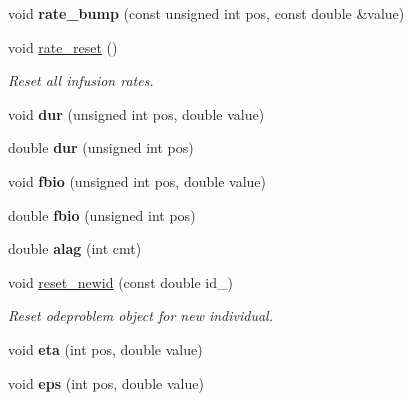 \begin{DoxyCompactItemize}
void {\bfseries rate\+\_\+bump} (const unsigned int pos, const double \&value)
\item 
\mbox{\label{classodeproblem_a89919c8495a969c85027b645cc611549}} 
void \hyperlink{classodeproblem_a89919c8495a969c85027b645cc611549}{rate\+\_\+reset} ()
\begin{DoxyCompactList}\small\item\em Reset all infusion rates. \end{DoxyCompactList}\item 
\mbox{\label{classodeproblem_a6b01a064fdeca43c8d70c9acaf4cd01a}} 
void {\bfseries dur} (unsigned int pos, double value)
\item 
\mbox{\label{classodeproblem_aa55e249b79cee0dd7292e2e26c512d4d}} 
double {\bfseries dur} (unsigned int pos)
\item 
\mbox{\label{classodeproblem_ae7047dc9fe7335cb4367a90a945801b5}} 
void {\bfseries fbio} (unsigned int pos, double value)
\item 
\mbox{\label{classodeproblem_abe453ef912e890b1f6e1fea51e627a5e}} 
double {\bfseries fbio} (unsigned int pos)
\item 
\mbox{\label{classodeproblem_a486c40b4b6746afe3aa079cb7bb5c7dc}} 
double {\bfseries alag} (int cmt)
\item 
\mbox{\label{classodeproblem_ae210665b2d2c52c802aa2d95304ba111}} 
void \hyperlink{classodeproblem_ae210665b2d2c52c802aa2d95304ba111}{reset\+\_\+newid} (const double id\+\_\+)
\begin{DoxyCompactList}\small\item\em Reset {\ttfamily odeproblem} object for new individual. \end{DoxyCompactList}\item 
\mbox{\label{classodeproblem_a54f096ed754117bfe2c1a58d6661c69c}} 
void {\bfseries eta} (int pos, double value)
\item 
\mbox{\label{classodeproblem_a21f796445e785d46939ac4c50e719c37}} 
void {\bfseries eps} (int pos, double value)

\end{DoxyCompactItemize}
